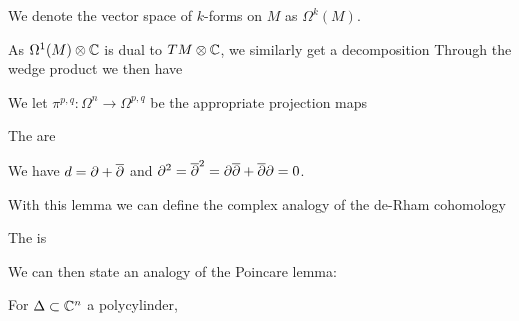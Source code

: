 \documentclass{article}
\begin{document}
\begin{notation}
	We denote the vector space of $k$-forms on $M$ as $\Omega^k(M)$. 
\end{notation}

As $\Omega^1(M)\otimes \mathbb{C}$ is dual to $TM\otimes \mathbb{C}$, we similarly get a decomposition
Through the wedge product we then have 
\begin{notation}
	We let $\pi^{p,q}:\Omega^n \to \Omega^{p,q}$ be the appropriate projection maps 
\end{notation}

\begin{definition}
	The  are 
\end{definition}

\begin{lemma}
	We have $d = \partial + \overline{\partial}$ and $\partial^2 = \overline{\partial}^2 = \partial \overline{\partial} + \overline{\partial} \partial = 0$.
\end{lemma}

With this lemma we can define the complex analogy of the de-Rham cohomology

\begin{definition}
	The  is 
\end{definition}

We can then state an analogy of the Poincare lemma:

\begin{prop}
	For $\Delta\subset \mathbb{C}^n$ a polycylinder, 
\end{prop}

\end{document}
